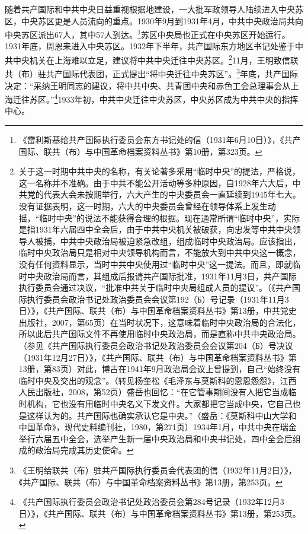 随着共产国际和中共中央日益重视根据地建设，一大批军政领导人陆续进入中央苏区，中央苏区更是人员流向的重点。1930年9月到1931年4月，中共中央政治局共向中央苏区派出67人，其中57人到达。\footnote{《雷利斯基给共产国际执行委员会东方书记处的信（1931年6月10日）》，《共产国际、联共（布）与中国革命档案资料丛书》第10册，第323页。}苏区中央局也正式在中央苏区开始运行。1931年底，周恩来进入中央苏区。1932年下半年，共产国际东方地区书记处鉴于中共中央机关在上海难以立足，建议将中共中央迁往中央苏区。\footnote{关于这一时期中共中央的名称，有关论著多采用“临时中央”的提法，严格说，这一名称并不准确。由于中共不能公开活动等多种原因，自1928年六大后，中共党的代表大会未按期举行，六大产生的中央委员会一直延续到1945年七大。没有证据表明，这一时期，六大的中央委员会曾经在领导体系上发生动摇，“临时中央”的说法不能获得合理的根据。现在通常所谓“临时中央”，实际是指1931年六届四中全会后，由于中共中央机关被破获，向忠发等中共中央领导人被捕，中共中央政治局被迫紧急改组，组成临时中央政治局。应该指出，临时中央政治局只是相对中央领导机构而言，不能放大到中共中央这一概念，没有任何资料显示，当时中共中央使用过“临时中央”这一提法。而且，即就临时中央政治局而言，其组成后报请共产国际批准，1931年11月3日，共产国际执行委员会通过决议，“批准中共关于临时中央局组成人员的提议”。（《共产国际执行委员会政治书记处政治委员会会议第192（Б）号记录（1931年11月3日）》，《共产国际、联共（布）与中国革命档案资料丛书》第13册，中共党史出版社，2007，第65页）在当时状况下，这意味着临时中央政治局的合法化，所以此后共产国际文件不再使用临时中央政治局，而是直称中共中央政治局。（参见《共产国际执行委员会政治书记处政治委员会会议第204（Б）号决议（1931年12月27日）》，《共产国际、联共（布）与中国革命档案资料丛书》第13册，第83页）对此，博古在1941年9月政治局会议上曾提到，自己“始终没有临时中央及交出的观念”。（转见杨奎松《毛泽东与莫斯科的恩恩怨怨》，江西人民出版社，2008，第52页）盛岳也回忆：“在它管事期间没有人把它当成临时机构，它也没有用临时中央名义下发文件。大家都把它当成中央，它自己也是这样认为的。共产国际也确实承认它是中央。”（盛岳：《莫斯科中山大学和中国革命》，现代史料编刊社，1980，第271页）1934年1月，中共中央在瑞金举行六届五中全会，选举产生新一届中央政治局和中央书记处，四中全会后组成的政治局完成其历史使命。}11月，王明致信联共（布）驻共产国际代表团，正式提出“将中央迁往中央苏区”。\footnote{《王明给联共（布）驻共产国际执行委员会代表团的信（1932年11月2日）》，《共产国际、联共（布）与中国革命档案资料丛书》第13册，第253页。}年底，共产国际决定：“采纳王明同志的建议，将中共中央、共青团中央和赤色工会总理事会从上海迁往苏区。”\footnote{《共产国际执行委员会政治书记处政治委员会第284号记录（1932年12月3日）》，《共产国际、联共（布）与中国革命档案资料丛书》第13册，第253页。}1933年初，中共中央迁往中央苏区，中央苏区成为中共中央的指挥中心。


